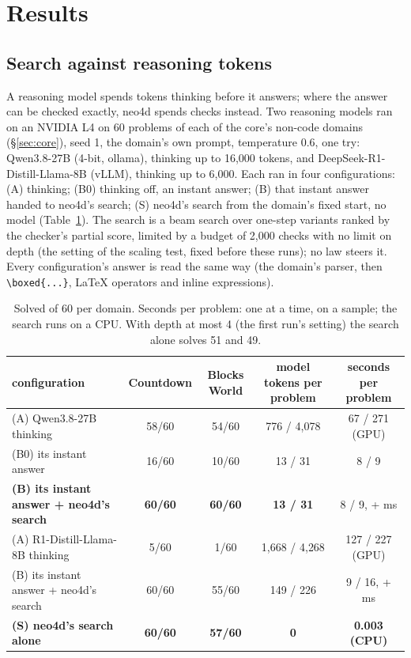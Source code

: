 \documentclass[10pt]{article}
\begin{document}
\section{Results}

\subsection{Search against reasoning tokens}
\label{sec:reasoning}
A reasoning model spends tokens thinking before it answers; where the answer can be checked exactly, neo4d spends
checks instead. Two reasoning models ran on an NVIDIA L4 on 60 problems of each of the core's non-code domains
(\S\ref{sec:core}), seed 1, the domain's own prompt, temperature 0.6, one try: Qwen3.8-27B (4-bit, ollama), thinking up
to 16{,}000 tokens, and DeepSeek-R1-Distill-Llama-8B (vLLM), thinking up to 6{,}000. Each ran in four configurations:
(A) thinking; (B0) thinking off, an instant answer; (B) that instant answer handed to neo4d's search; (S) neo4d's
search from the domain's fixed start, no model (Table~\ref{tab:reasoning}). The search is a beam search over one-step
variants ranked by the checker's partial score, limited by a budget of 2{,}000 checks with no limit on depth (the
setting of the scaling test, fixed before these runs); no law steers it. Every configuration's answer is read the same
way (the domain's parser, then \verb|\boxed{...}|, LaTeX operators and inline expressions).
\begin{table}[H]
\centering\small
\setlength{\tabcolsep}{4pt}
\begin{tabular}{lcccc}
\toprule
configuration & Countdown & Blocks World & model tokens per problem & seconds per problem\\
\midrule
(A) Qwen3.8-27B thinking & 58/60 & 54/60 & 776 / 4{,}078 & 67 / 271 (GPU)\\
(B0) its instant answer & 16/60 & 10/60 & 13 / 31 & 8 / 9\\
\textbf{(B) its instant answer + neo4d's search} & \textbf{60/60} & \textbf{60/60} & \textbf{13 / 31} & 8 / 9, + ms\\
(A) R1-Distill-Llama-8B thinking & 5/60 & 1/60 & 1{,}668 / 4{,}268 & 127 / 227 (GPU)\\
(B) its instant answer + neo4d's search & 60/60 & 55/60 & 149 / 226 & 9 / 16, + ms\\
\textbf{(S) neo4d's search alone} & \textbf{60/60} & \textbf{57/60} & \textbf{0} & \textbf{0.003 (CPU)}\\
\bottomrule
\end{tabular}
\caption{Solved of 60 per domain. Seconds per problem: one at a time, on a sample; the search runs on a CPU. With depth
at most 4 (the first run's setting) the search alone solves 51 and 49.}
\label{tab:reasoning}
\end{table}
\end{document}

